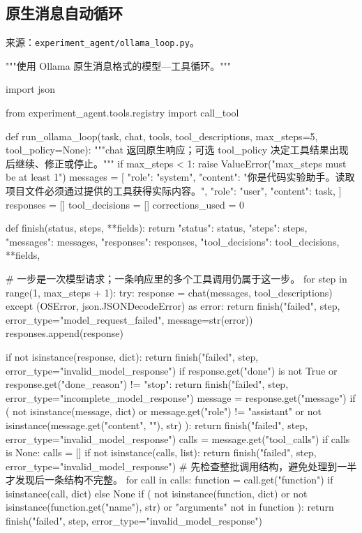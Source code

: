 \documentclass[UTF8,zihao=-4,fontset=fandol]{ctexart}
\begin{document}
\subsection{原生消息自动循环}

来源：\nolinkurl{experiment_agent/ollama_loop.py}。

\begin{Code}
"""使用 Ollama 原生消息格式的模型—工具循环。"""

import json

from experiment_agent.tools.registry import call_tool


def run_ollama_loop(task, chat, tools, tool_descriptions, max_steps=5, tool_policy=None):
    """chat 返回原生响应；可选 tool_policy 决定工具结果出现后继续、修正或停止。"""
    if max_steps < 1:
        raise ValueError("max_steps must be at least 1")
    messages = [
        {"role": "system", "content": "你是代码实验助手。读取项目文件必须通过提供的工具获得实际内容。"},
        {"role": "user", "content": task},
    ]
    responses = []
    tool_decisions = []
    corrections_used = 0

    def finish(status, steps, **fields):
        return {
            "status": status, "steps": steps, "messages": messages,
            "responses": responses, "tool_decisions": tool_decisions, **fields,
        }

    # 一步是一次模型请求；一条响应里的多个工具调用仍属于这一步。
    for step in range(1, max_steps + 1):
        try:
            response = chat(messages, tool_descriptions)
        except (OSError, json.JSONDecodeError) as error:
            return finish("failed", step, error_type="model_request_failed", message=str(error))
        responses.append(response)

        if not isinstance(response, dict):
            return finish("failed", step, error_type="invalid_model_response")
        if response.get("done") is not True or response.get("done_reason") != "stop":
            return finish("failed", step, error_type="incomplete_model_response")
        message = response.get("message")
        if (
            not isinstance(message, dict)
            or message.get("role") != "assistant"
            or not isinstance(message.get("content", ""), str)
        ):
            return finish("failed", step, error_type="invalid_model_response")
        calls = message.get("tool_calls")
        if calls is None:
            calls = []
        if not isinstance(calls, list):
            return finish("failed", step, error_type="invalid_model_response")
        # 先检查整批调用结构，避免处理到一半才发现后一条结构不完整。
        for call in calls:
            function = call.get("function") if isinstance(call, dict) else None
            if (
                not isinstance(function, dict)
                or not isinstance(function.get("name"), str)
                or "arguments" not in function
            ):
                return finish("failed", step, error_type="invalid_model_response")


\end{Code}
\end{document}
